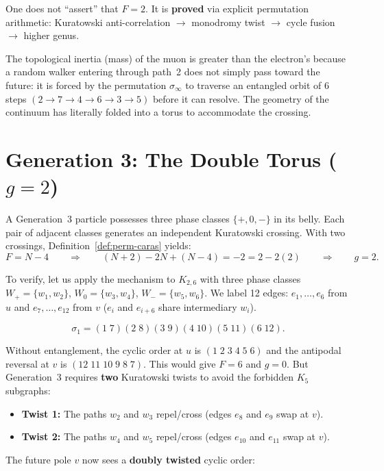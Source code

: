 \begin{result}[title={The rigorous proof of topological mass}]
One does not ``assert'' that $F = 2$. It is \textbf{proved} via explicit
permutation arithmetic: Kuratowski anti-correlation $\to$
monodromy twist $\to$ cycle fusion $\to$ higher genus.

The topological inertia (mass) of the muon is greater than the electron's
because a random walker entering through path~2 does not simply
pass toward the future: it is forced by the permutation $\sigma_\infty$ to
traverse an entangled orbit of 6 steps
$(2 \to 7 \to 4 \to 6 \to 3 \to 5)$ before it can resolve. The
geometry of the continuum has literally folded into a torus to
accommodate the crossing.
\end{result}


\section{Generation 3: The Double Torus ($g = 2$)}
\label{sec:gen3-doble-toro}

A Generation~3 particle possesses three phase classes
$\{+, 0, -\}$ in its belly. Each pair of adjacent classes generates an
independent Kuratowski crossing. With two crossings,
Definition~\ref{def:perm-caras} yields:
\[
  F = N - 4 \qquad\Longrightarrow\qquad
  (N+2) - 2N + (N-4) = -2 = 2 - 2(2)
  \qquad\Longrightarrow\qquad g = 2.
\]

To verify, let us apply the mechanism to $K_{2,6}$ with three phase
classes $W_+ = \{w_1, w_2\}$, $W_0 = \{w_3, w_4\}$,
$W_- = \{w_5, w_6\}$. We label 12 edges: $e_1, \ldots, e_6$
from $u$ and $e_7, \ldots, e_{12}$ from $v$
($e_i$ and $e_{i+6}$ share intermediary $w_i$).

\[
  \sigma_1 = (1\;7)(2\;8)(3\;9)(4\;10)(5\;11)(6\;12).
\]

Without entanglement, the cyclic order at $u$ is $(1\;2\;3\;4\;5\;6)$ and
the antipodal reversal at $v$ is $(12\;11\;10\;9\;8\;7)$. This would give
$F = 6$ and $g = 0$. But Generation~3 requires \textbf{two} Kuratowski
twists to avoid the forbidden $K_5$ subgraphs:
\begin{itemize}
  \item \textbf{Twist 1:} The paths $w_2$ and $w_3$ repel/cross
        (edges $e_8$ and $e_9$ swap at $v$).
  \item \textbf{Twist 2:} The paths $w_4$ and $w_5$ repel/cross
        (edges $e_{10}$ and $e_{11}$ swap at $v$).
\end{itemize}
The future pole $v$ now sees a \textbf{doubly twisted} cyclic order:

